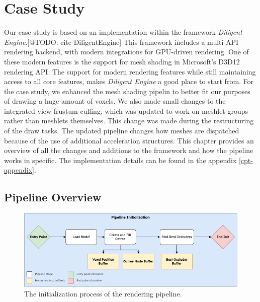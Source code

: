 \chapter{Case Study} \label{cpt-case-study}

Our case study is based on an implementation within the framework \emph{Diligent Engine}.[@TODO: cite DiligentEngine]
This framework includes a multi-\ac{API} rendering backend, with modern integrations for \ac{GPU}-driven rendering.
One of these modern features is the support for mesh shading in Microsoft's D3D12 rendering \ac{API}. 
The support for modern rendering features while still maintaining access to all core features, makes 
\emph{Diligent Engine} a good place to start from. For the case study, we enhanced the mesh shading pipelin 
to better fit our purposes of drawing a huge amount of voxels. We also made small changes to the integrated 
view-frustum culling, which was updated to work on meshlet-groups rather than meshlets themselves. This change 
was made during the restructuring of the draw tasks. The updated pipeline changes how meshes are dispatched 
because of the use of additional acceleration structures. This chapter provides an overview of all the changes and 
additions to the framework and how the pipeline works in specific. The implementation details can be found in the 
appendix \ref{cpt-appendix}.

\section{Pipeline Overview}

\begin{figure}[h]
    \centering
    \includegraphics[width=\linewidth]{images/graphics/pipeline-initialization.png}
    \caption{The initialization process of the rendering pipeline. }
    \label{fig:pipeline-initialization}
\end{figure}



